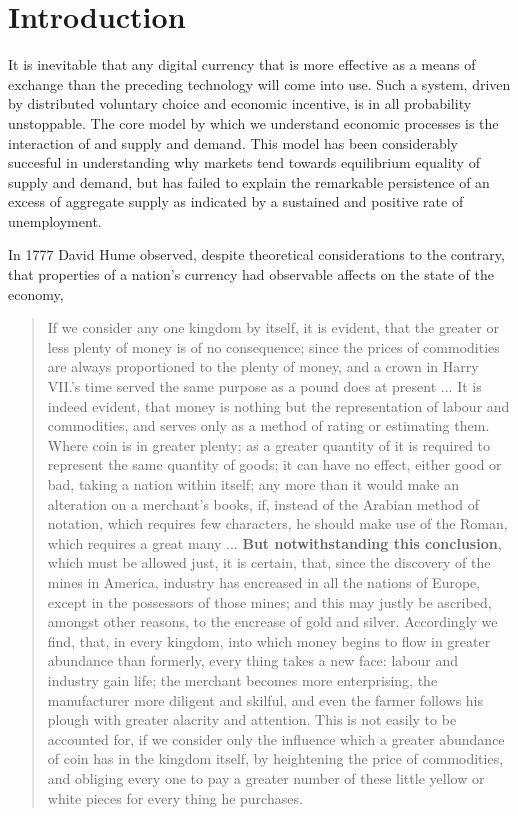 
\chapter{Introduction}

It is inevitable that any digital currency that is more effective as a means of exchange than
the preceding technology will come into use. Such a system, driven by distributed voluntary choice
and economic incentive, is in all probability unstoppable. The core model by which we understand
economic processes is the interaction of and supply and demand. This model has been considerably
succesful in understanding why markets tend towards equilibrium equality of supply and demand, but
has failed to explain the remarkable persistence of an excess of aggregate supply as indicated by a
sustained and positive rate of unemployment.

In 1777 David Hume observed, despite theoretical considerations to the contrary, that properties of
a nation's currency had observable affects on the state of the economy,

\begin{quotation}
If we consider any one kingdom by itself, it is evident, that the greater or less plenty of money is
    of no consequence; since the prices of commodities are always proportioned to the plenty of
    money, and a crown in Harry VII.’s time served the same purpose as a pound does at present ...
    It is indeed evident, that money is nothing but the representation of labour and commodities,
    and serves only as a method of rating or estimating them. Where coin is in greater plenty; as a
    greater quantity of it is required to represent the same quantity of goods; it can have no
    effect, either good or bad, taking a nation within itself; any more than it would make an
    alteration on a merchant’s books, if, instead of the Arabian method of notation, which requires
    few characters, he should make use of the Roman, which requires a great many ... \textbf{But notwithstanding this conclusion}, which must be allowed just, it is certain, that, since the
    discovery of the mines in America, industry has encreased in all the nations of Europe, except
    in the possessors of those mines; and this may justly be ascribed, amongst other reasons, to the
    encrease of gold and silver.  Accordingly we find, that, in every kingdom, into which money
    begins to flow in greater abundance than formerly, every thing takes a new face: labour and
    industry gain life; the merchant becomes more enterprising, the manufacturer more diligent and
    skilful, and even the farmer follows his plough with greater alacrity and attention. This is not
    easily to be accounted for, if we consider only the influence which a greater abundance of coin
    has in the kingdom itself, by heightening the price of commodities, and obliging every one to
    pay a greater number of these little yellow or white pieces for every thing he purchases.
\end{quotation}


